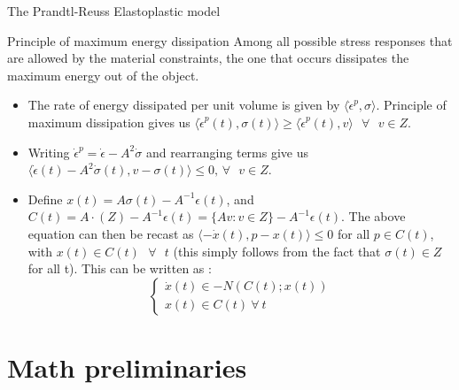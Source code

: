 \documentclass[8pt,aspectratio=169]{beamer}
\begin{document}
\begin{frame}[fragile]{The Prandtl-Reuss Elastoplastic model}
    \begin{block}{Principle of maximum energy dissipation}
        Among all possible stress responses that are allowed by the material constraints, the one that occurs dissipates the maximum energy out of the object.
    \end{block}
    \begin{itemize}
        \item The rate of energy dissipated per unit volume is given by $\langle \dot{\epsilon}^p, \sigma\rangle$. Principle of maximum dissipation gives us $\langle \dot{\epsilon}^p(t), \sigma(t) \rangle \geq \langle \dot{\epsilon}^p(t), v\rangle \text{ } \forall \text{ } v \in Z$.
        \item Writing $\dot{\epsilon}^p = \dot{\epsilon} - A^2 \dot{\sigma}$ and rearranging terms give us $\langle \dot{\epsilon}(t) - A^2 \dot{\sigma}(t), v - \sigma(t) \rangle \leq 0 \text{, } \forall \text{ } v \in Z$. 
        \item Define $x(t) = A \sigma(t) - A^{-1}\epsilon(t)$, and $C(t) = A\cdot (Z) - A^{-1} \epsilon(t) = \{Av : v \in Z \} - A^{-1}\epsilon(t)$. The above equation can then be recast as $\langle -\dot{x}(t), p - x(t)\rangle \leq 0$ for all $p \in C(t)$, with $x(t) \in C(t) \text{ } \forall \text{ } t$ (this simply follows from the fact that $\sigma(t) \in Z$ for all t). This can be written as : 
            \begin{equation*}
                \begin{cases}
                    \dot{x}(t) \in -N(C(t); x(t))\\
                    x(t) \in C(t) \ \forall \ t
                \end{cases}
            \end{equation*}
    \end{itemize}
\end{frame}

\section{Math preliminaries}
\end{document}
